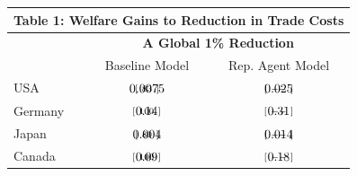 \documentclass[12pt,pdftex]{article}
\renewcommand{\arraystretch}{1.1}
\begin{document}
\begin{onehalfspacing}
\begin{table}[t]
\footnotesize
\setlength {\tabcolsep}{15.15mm}
\renewcommand{\arraystretch}{1.9}
\begin{center}
\begin{tabular}{l c c}
\multicolumn{3}{c}{\small  \textbf{Table 1: Welfare Gains to Reduction in Trade Costs}}\\
\hline
\hline
& \multicolumn{2}{c}{\small \textbf{A Global 1\% Reduction}} \\
\footnotesize   & \footnotesize  Baseline Model &  \footnotesize  Rep. Agent Model\\
\hline
\footnotesize  USA  & $\begin{array}{c}0.0075 \vspace{-.45cm}\\ \scriptstyle [ \ 83 \ ]\end{array}$   & $\begin{array}{c}0.025 \vspace{-.45cm}\\ \scriptstyle [ \ -- \ ]\end{array}$\\
\footnotesize  Germany  & $\begin{array}{c}0.14 \vspace{-.45cm}\\ \scriptstyle [ \ 100 \ ]\end{array}$   & $\begin{array}{c}0.31 \vspace{-.45cm}\\ \scriptstyle [ \ -- \ ]\end{array}$\\
\footnotesize  Japan  & $\begin{array}{c}0.004 \vspace{-.45cm}\\ \scriptstyle [ \ 80 \ ]\end{array}$   & $\begin{array}{c}0.014 \vspace{-.45cm}\\ \scriptstyle [ \ -- \ ]\end{array}$\\
\footnotesize  Canada  & $\begin{array}{c}0.09 \vspace{-.45cm}\\ \scriptstyle [ \ 100 \ ]\end{array}$   & $\begin{array}{c}0.18 \vspace{-.45cm}\\ \scriptstyle [ \ -- \ ]\end{array}$\\

\end{tabular}
\end{center}
\end{table}
\end{onehalfspacing}
\end{document}
